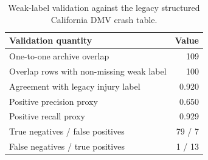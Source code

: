 \begin{table}[H]
\centering
\caption{Weak-label validation against the legacy structured California DMV crash table.}
\label{tab:weak_label_validation}
\small
\begin{tabular}{p{7.4cm}r}
\toprule
Validation quantity & Value \\
\midrule
One-to-one archive overlap & 109 \\
Overlap rows with non-missing weak label & 100 \\
Agreement with legacy injury label & 0.920 \\
Positive precision proxy & 0.650 \\
Positive recall proxy & 0.929 \\
True negatives / false positives & 79 / 7 \\
False negatives / true positives & 1 / 13 \\
\bottomrule
\end{tabular}
\end{table}
